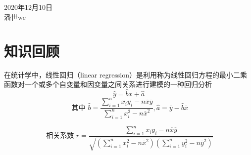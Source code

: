 \documentclass[UTF8]{article}
\begin{document}
   
\begin{center}
{}
\\ \hspace*{\fill} \\ 2020年12月10日 
\\潘世we\\
\end{center}
\section{知识回顾}  
在统计学中，线性回归（linear regression）是利用称为线性回归方程的最小二乘函数对一个或多个自变量和因变量之间关系进行建模的一种回归分析\\
$$\hat { y } = \hat { b } x + \hat { a }$$ 
$$\text { 其中 }\hat { b } = \frac { \sum\limits _ { i = 1 } ^ { n } x _ { i } y _ { i } - n \overline { x } \overline { y } } { \sum \limits_ { i = 1 } ^ { n } x _ { i } ^ { 2 } - n \overline { x } ^ { 2 } } , \hat { a } = \overline { y } - \hat { b } \overline { x }$$

$$\text { 相关系数 }r = \frac { \sum \limits_ { i = 1 } ^ { n } x _ { i } y _ { i } - n \overline { x } \overline { y } } { \sqrt { ( \sum \limits_ { i = 1 } ^ { n } x _ { i } ^ { 2 } - n \overline { x } ^ { 2 } ) ( \sum \limits_ { i = 1 } ^ { n } y _ { i } ^ { 2 } - n \overline { y } ^ { 2 } ) } } $$
\\
\end{document}
